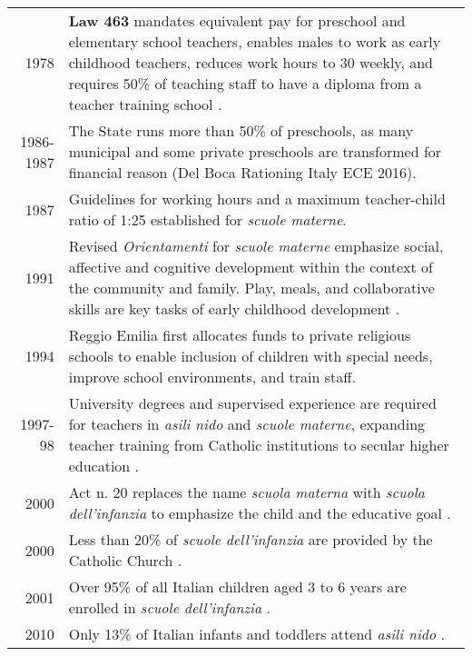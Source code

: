 \documentclass[11pt]{article}
\begin{document}
\begin{table}[htbp]
\begin{longtable}{r L{45em}}
  1978 & \textbf{Law 463} mandates equivalent pay for preschool and elementary school teachers, enables males to work as early childhood teachers, reduces work hours to 30 weekly, and requires 50\% of teaching staff to have a diploma from a teacher training school \citep{Hohnerlein_2015_Development-and-Diffusion}. \\
  1986-1987 & The State runs more than 50\% of preschools, as many municipal and some private preschools are transformed for financial reason (Del Boca Rationing Italy ECE 2016). \\
  1987 & Guidelines for working hours and a maximum teacher-child ratio of 1:25 established for \textit{scuole materne}. \\
  1991 & Revised \textit{Orientamenti} for \textit{scuole materne} emphasize social, affective and cognitive development within the context of the community and family. Play, meals, and collaborative skills are key tasks of early childhood development \citep{Corsaro_1996_Early-Edu}. \\
  1994 & Reggio Emilia first allocates funds to private religious schools to enable inclusion of children with special needs, improve school environments, and train staff. \\
  1997-98 & University degrees and supervised experience are required for teachers in \textit{asili nido} and \textit{scuole materne}, expanding teacher training from Catholic institutions to secular higher education \citep{Ghedini_2001_Ital-Natl-Policy}.  \\
  2000 &  Act n. 20 replaces the name \textit{scuola materna} with \textit{scuola dell'infanzia} to emphasize the child and the educative goal \citep{Hohnerlein_2015_Development-and-Diffusion}. \\
  2000 & Less than 20\% of \textit{scuole dell'infanzia} are provided by the Catholic Church \citep{Hohnerlein_2009_Paradox-Public-Preschools}.  \\
  2001 & Over 95\% of all Italian children aged 3 to 6 years are enrolled in \textit{scuole dell'infanzia} \citep{OECD_2001_Italy-Country-Note}. \\
  2010 & Only 13\% of Italian infants and toddlers attend \textit{asili nido} \citep{Del-Boca-etal_2016_CESifo-ES}. \\
\bottomrule
\end{longtable}
\end{table}
\end{document}
